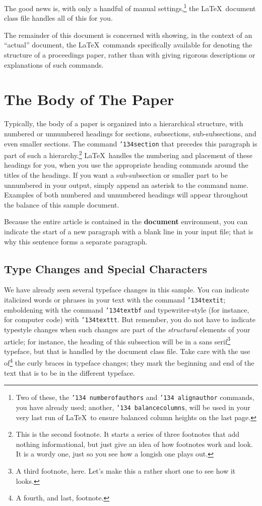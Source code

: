 \documentclass{nime-alternate} %
\begin{document}
The good news is, with only a handful of manual
settings,\footnote{Two of these, the {\texttt{\char'134 numberofauthors}}
and {\texttt{\char'134 alignauthor}} commands, you have
already used; another, {\texttt{\char'134 balancecolumns}}, will
be used in your very last run of \LaTeX\ to ensure
balanced column heights on the last page.} the \LaTeX\ document
class file handles all of this for you.

The remainder of this document is concerned with showing, in
the context of an ``actual'' document, the \LaTeX\ commands
specifically available for denoting the structure of a
proceedings paper, rather than with giving rigorous descriptions
or explanations of such commands.

\section{The {\secit Body} of The Paper}
Typically, the body of a paper is organized
into a hierarchical structure, with numbered or unnumbered
headings for sections, subsections, sub-subsections, and even
smaller sections.  The command \texttt{{\char'134}section} that
precedes this paragraph is part of such a
hierarchy.\footnote{This is the second footnote.  It
starts a series of three footnotes that add nothing
informational, but just give an idea of how footnotes work
and look. It is a wordy one, just so you see
how a longish one plays out.} \LaTeX\ handles the numbering
and placement of these headings for you, when you use
the appropriate heading commands around the titles
of the headings.  If you want a sub-subsection or
smaller part to be unnumbered in your output, simply append an
asterisk to the command name.  Examples of both
numbered and unnumbered headings will appear throughout the
balance of this sample document.

Because the entire article is contained in
the \textbf{document} environment, you can indicate the
start of a new paragraph with a blank line in your
input file; that is why this sentence forms a separate paragraph.

\subsection{Type Changes and {\subsecit Special} Characters}
We have already seen several typeface changes in this sample.  You
can indicate italicized words or phrases in your text with
the command \texttt{{\char'134}textit}; emboldening with the
command \texttt{{\char'134}textbf}
and typewriter-style (for instance, for computer code) with
\texttt{{\char'134}texttt}.  But remember, you do not
have to indicate typestyle changes when such changes are
part of the \textit{structural} elements of your
article; for instance, the heading of this subsection will
be in a sans serif\footnote{A third footnote, here.
Let's make this a rather short one to
see how it looks.} typeface, but that is handled by the
document class file. Take care with the use
of\footnote{A fourth, and last, footnote.}
the curly braces in typeface changes; they mark
the beginning and end of
the text that is to be in the different typeface.
\end{document}
